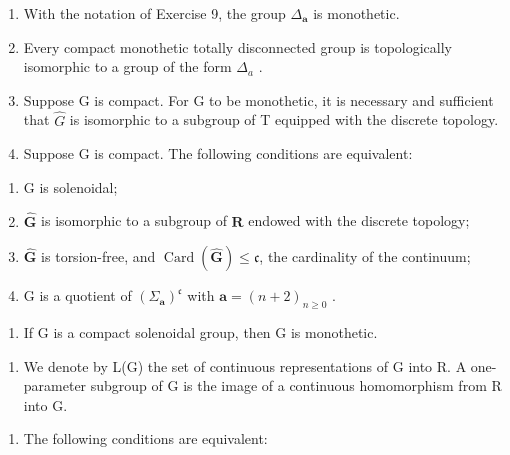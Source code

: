 \begin{enumerate}
\def\labelenumi{\alph{enumi})}
\item
  With the notation of Exercise 9, the group \(\Delta_{\pmb{a}}\) is monothetic.
\item
  Every compact monothetic totally disconnected group is topologically isomorphic to a group of the form \(\Delta_{a}\) .
\item
  Suppose G is compact. For G to be monothetic, it is necessary and sufficient that \(\widehat{G}\) is isomorphic to a subgroup of T equipped with the discrete topology.
\item
  Suppose G is compact. The following conditions are equivalent:
\end{enumerate}

\begin{enumerate}
\def\labelenumi{(\roman{enumi})}
\item
  G is solenoidal;
\item
  \(\widehat{\mathbf{G}}\) is isomorphic to a subgroup of \(\mathbf{R}\) endowed with the discrete topology;
\item
  \(\widehat{\mathbf{G}}\) is torsion-free, and \(\operatorname{Card}(\widehat{\mathbf{G}}) \leqslant \mathfrak{c}\), the cardinality of the continuum;
\item
  G is a quotient of \((\Sigma_{\boldsymbol{a}})^{\mathfrak{c}}\) with \(\boldsymbol{a}=(n+2)_{n\geqslant0}\) .
\end{enumerate}

\begin{enumerate}
\def\labelenumi{\alph{enumi})}
\setcounter{enumi}{4}
\tightlist
\item
  If G is a compact solenoidal group, then G is monothetic.
\end{enumerate}

\begin{enumerate}
\def\labelenumi{\arabic{enumi})}
\setcounter{enumi}{10}
\tightlist
\item
  We denote by L(G) the set of continuous representations of G into R. A one-parameter subgroup of G is the image of a continuous homomorphism from R into G.
\end{enumerate}

\begin{enumerate}
\def\labelenumi{\alph{enumi})}
\tightlist
\item
  The following conditions are equivalent:
\end{enumerate}

